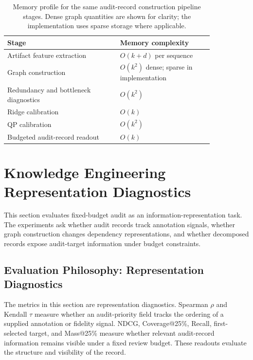 \documentclass[a4paper,fleqn]{cas-sc}
\begin{document}
\begin{table}[ht]
\caption{Memory profile for the same audit-record construction pipeline stages. Dense graph quantities are shown for clarity; the implementation uses sparse storage where applicable.}
\label{tab:memory-summary}
\centering
\small
\renewcommand{\arraystretch}{1.08}
\begin{tabular}{p{0.46\linewidth}p{0.38\linewidth}}
\toprule
\textbf{Stage} & \textbf{Memory complexity} \\
\midrule
Artifact feature extraction & $O(k+d)$ per sequence \\
Graph construction & $O(k^2)$ dense; sparse in implementation \\
Redundancy and bottleneck diagnostics & $O(k^2)$ \\
Ridge calibration & $O(k)$ \\
QP calibration & $O(k^2)$ \\
Budgeted audit-record readout & $O(k)$ \\
\bottomrule
\end{tabular}
\end{table}

\FloatBarrier

\section{Knowledge Engineering Representation Diagnostics}
\label{sec:application}
\label{sec:experimental-results}

This section evaluates fixed-budget audit as an information-representation task. The experiments ask whether audit records track annotation signals, whether graph construction changes dependency representations, and whether decomposed records expose audit-target information under budget constraints.

\subsection{Evaluation Philosophy: Representation Diagnostics}
\label{sec:evaluation-philosophy}

The metrics in this section are representation diagnostics. Spearman $\rho$ and Kendall $\tau$ measure whether an audit-priority field tracks the ordering of a supplied annotation or fidelity signal. NDCG, Coverage@25\%, Recall, first-selected target, and Mass@25\% measure whether relevant audit-record information remains visible under a fixed review budget. These readouts evaluate the structure and visibility of the record.
\end{document}
